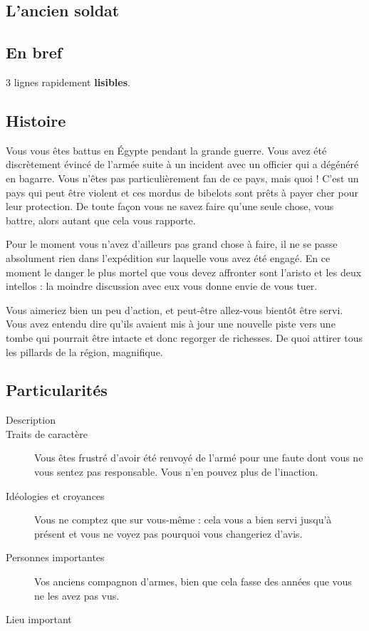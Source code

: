 \documentclass[11pt]{article}
\begin{document}
\begin{twocols}
\section{L'ancien soldat}
\label{sec:org5d5ff86}

\subsection{En bref}
\label{sec:orgb4887fd}

3 lignes rapidement \textbf{lisibles}.

\subsection{Histoire}
\label{sec:orgdbb2e9d}

Vous vous êtes battus en Égypte pendant la grande guerre. Vous avez été discrètement évincé de l'armée suite à un incident avec un officier qui a dégénéré en bagarre. Vous n'êtes pas particulièrement fan de ce pays, mais quoi ! C'est un pays qui peut être violent et ces mordus de bibelots sont prêts à payer cher pour leur protection. De toute façon vous ne savez faire qu'une seule chose, vous battre, alors autant que cela vous rapporte.

Pour le moment vous n'avez d'ailleurs pas grand chose à faire, il ne se passe absolument rien dans l'expédition sur laquelle vous avez été engagé. En ce moment le danger le plus mortel que vous devez affronter sont l'aristo et les deux intellos : la moindre discussion avec eux vous donne envie de vous tuer.

Vous aimeriez bien un peu d'action, et peut-être allez-vous bientôt être servi. Vous avez entendu dire qu'ils avaient mis à jour une nouvelle piste vers une tombe qui pourrait être intacte et donc regorger de richesses. De quoi attirer tous les pillards de la région, magnifique. 

\subsection{Particularités}
\label{sec:orgb324056}

\begin{description}
\item[{Description}] 

\item[{Traits de caractère}] Vous êtes frustré d'avoir été renvoyé de l'armé pour une faute dont vous ne vous sentez pas responsable. Vous n'en pouvez plus de l'inaction.
\item[{Idéologies et croyances}] Vous ne comptez que sur vous-même : cela vous a bien servi jusqu'à présent et vous ne voyez pas pourquoi vous changeriez d'avis.
\item[{Personnes importantes}] Vos anciens compagnon d'armes, bien que cela fasse des années que vous ne les avez pas vus.
\item[{Lieu important}] 


\end{description}
\end{twocols}
\end{document}
